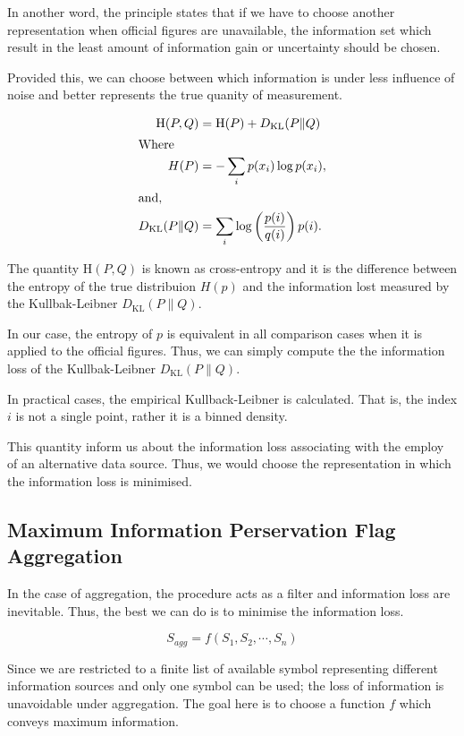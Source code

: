 \documentclass[nojss]{jss}
\begin{document}
In another word, the principle states that if we have to choose
another representation when official figures are unavailable, the
information set which result in the least amount of information gain
or uncertainty should be chosen.

Provided this, we can choose between which information is under less
influence of noise and better represents the true quanity of
measurement.


\begin{align*}
  \mathrm{H}(P, Q) &=  \mathrm{H}(P) + D_{\mathrm{KL}}(P \| Q)\\
  \intertext{Where}
  H(P) &= -\sum_{i} {p(x_i) \log p(x_i)},\\
  \intertext{and,}
  D_{\mathrm{KL}}(P\|Q) &= \sum_i \log\left(\frac{p(i)}{q(i)}\right) p(i).\\
\end{align*}

The quantity $\mathrm{H}(P, Q)$ is known as cross-entropy and it is
the difference between the entropy of the true distribuion $H(p)$ and
the information lost measured by the Kullbak-Leibner
$D_{\mathrm{KL}}(P\|Q)$. 

In our case, the entropy of $p$ is equivalent in all comparison cases
when it is applied to the official figures. Thus, we can simply
compute the the information loss of the Kullbak-Leibner
$D_{\mathrm{KL}}(P\|Q)$.

In practical cases, the empirical Kullback-Leibner is calculated. That
is, the index $i$ is not a single point, rather it is a binned
density.

This quantity inform us about the information loss associating with
the employ of an alternative data source. Thus, we would choose the
representation in which the information loss is minimised.

\subsection{Maximum Information Perservation Flag Aggregation}

In the case of aggregation, the procedure acts as a filter and
information loss are inevitable. Thus, the best we can do is to
minimise the information loss.

\begin{equation}
S_{agg} = f(S_{1}, S_{2}, \cdots, S_{n})
\end{equation}

Since we are restricted to a finite list of available symbol
representing different information sources and only one symbol can be
used; the loss of information is unavoidable under aggregation. The
goal here is to choose a function $f$ which conveys maximum
information.
\end{document}
